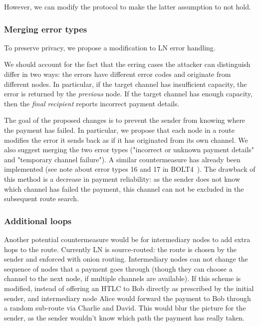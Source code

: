 However, we can modify the protocol to make the latter assumption to not hold.

\subsubsection{Merging error types}
To preserve privacy, we propose a modification to LN error handling.

We should account for the fact that the erring cases the attacker can distinguish differ in two ways: the errors have different error codes and originate from different nodes.
In particular, if the target channel has insufficient capacity, the error is returned by the \textit{previous} node.
If the target channel has enough capacity, then the \textit{final recipient} reports incorrect payment details.

The goal of the proposed changes is to prevent the sender from knowing where the payment has failed.
In particular, we propose that each node in a route modifies the error it sends back as if it has originated from its own channel.
We also suggest merging the two error types ("incorrect or unknown payment details" and "temporary channel failure").
A similar countermeasure has already been implemented (see note about error types 16 and 17 in BOLT4~\cite{Bolt4OnionRouting}).
The drawback of this method is a decrease in payment reliability: as the sender does not know which channel has failed the payment, this channel can not be excluded in the subsequent route search.

\subsubsection{Additional loops}
Another potential countermeasure would be for intermediary nodes to add extra hops to the route.
Currently LN is source-routed: the route is chosen by the sender and enforced with onion routing.
Intermediary nodes can not change the sequence of nodes that a payment goes through (though they can choose a channel to the next node, if multiple channels are available).
If this scheme is modified, instead of offering an HTLC to Bob directly as prescribed by the initial sender, and intermediary node Alice would forward the payment to Bob through a random sub-route via Charlie and David.
This would blur the picture for the sender, as the sender wouldn't know which path the payment has really taken.

